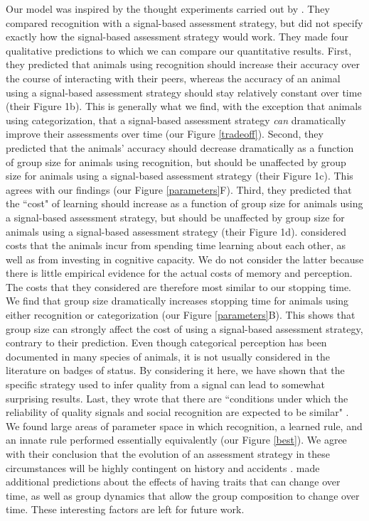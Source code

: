Our model was inspired by the thought experiments carried out by \citet{sheehan2016evotradeoff}. They compared recognition with a signal-based assessment strategy, but did not specify exactly how the signal-based assessment strategy would work. They made four qualitative predictions to which we can compare our quantitative results. First, they predicted that animals using recognition should increase their accuracy over the course of interacting with their peers, whereas the accuracy of an animal using a signal-based assessment strategy should stay relatively constant over time (their Figure 1b). This is generally what we find, with the exception that animals using categorization, that a signal-based assessment strategy \emph{can} dramatically improve their assessments over time (our Figure \ref{tradeoff}). %
Second, they predicted that the animals' accuracy should decrease dramatically as a function of group size for animals using recognition, but should be unaffected by group size for animals using a signal-based assessment strategy (their Figure 1c). This agrees with our findings (our Figure \ref{parameters}F). Third, they predicted that the ``cost" of learning should increase as a function of group size for animals using a signal-based assessment strategy, but should be unaffected by group size for animals using a signal-based assessment strategy (their Figure 1d). \citet{sheehan2016evotradeoff} considered costs that the animals incur from spending time learning about each other, as well as from investing in cognitive capacity. We do not consider the latter because there is little empirical evidence for the actual costs of memory and perception. The costs that they considered are therefore most similar to our stopping time. We find that group size dramatically increases stopping time for animals using either recognition or categorization (our Figure \ref{parameters}B). This shows that group size can strongly affect the cost of using a signal-based assessment strategy, contrary to their prediction. Even though categorical perception has been documented in many species of animals, it is not usually considered in the literature on badges of status. By considering it here, we have shown that the specific strategy used to infer quality from a signal can lead to somewhat surprising results. Last, they wrote that there are ``conditions under which the reliability of quality signals and social recognition are expected to be similar" \citep{sheehan2016evotradeoff}. We found large areas of parameter space in which recognition, a learned rule, and an innate rule performed essentially equivalently (our Figure \ref{best}). We agree with their conclusion that the evolution of an assessment strategy in these circumstances will be highly contingent on history and accidents \citep{sheehan2016evotradeoff}. \citet{sheehan2016evotradeoff} made additional predictions about the effects of having traits that can change over time, as well as group dynamics that allow the group composition to change over time. These interesting factors are left for future work.

